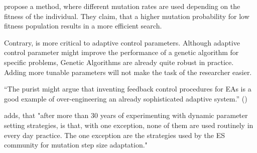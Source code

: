 \cite{marsili_libelli_adaptive_2000} propose a method, where different mutation rates are used depending on the fitness of the individual. They claim, that a higher mutation probability for low fitness population results in a more efficient search.

Contrary, \cite{kacprzyk_parameter_2007} is more critical to adaptive control parameters. Although adaptive control parameter might improve the performance of a genetic algorithm for specific problems, Genetic Algorithms are already quite robust in practice. Adding more tunable parameters will not make the task of the researcher easier.

\enquote{The purist might argue that inventing feedback control procedures for EAs is a good example of over-engineering an already sophisticated adaptive system.} (\cite{kacprzyk_parameter_2007})

\cite{kacprzyk_parameter_2007} adds, that "after more than 30 years of experimenting with dynamic parameter setting strategies, is that, with one exception, none of them are used routinely in every day practice. The one exception are the strategies used by the ES community for mutation step size adaptation."

